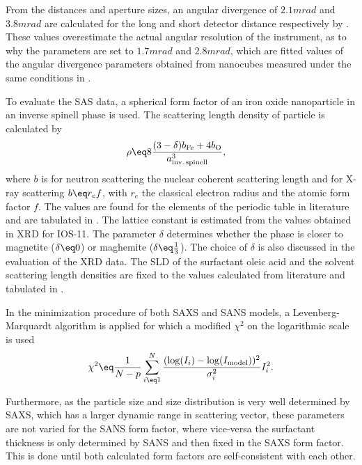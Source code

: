 \documentclass[\main/dresen_thesis.tex]{subfiles}
\begin{document}
    From the distances and aperture sizes, an angular divergence of $2.1 \unit{mrad}$ and $3.8 \unit{mrad}$ are calculated for the long and short detector distance respectively by .
    These values overestimate the actual angular resolution of the instrument, as to why the parameters are set to $1.7 \unit{mrad}$ and $2.8 \unit{mrad}$, which are fitted values of the angular divergence parameters obtained from nanocubes measured under the same conditions in .

    To evaluate the SAS data, a spherical form factor of an iron oxide nanoparticle in an inverse spinell phase is used.
    The scattering length density of particle is calculated by
    \begin{align}
      \rho &\eq   8 \frac{(3-\delta) b_\mathrm{Fe} + 4 b_\mathrm{O}}{a_\mathrm{inv.\,spinell}^3},
    \end{align}
    where $b$ is for neutron scattering the nuclear coherent scattering length and for X-ray scattering $b \eq r_e f$, with $r_e$ the classical electron radius and the  atomic form factor $f$.
    The values are found for the elements of the periodic table in literature \cite{Sears_1992_Neutr, BerkeleyLab_1993_asf} and are tabulated in .
    The lattice constant is estimated from the values obtained in XRD for IOS-11.
    The parameter $\delta$ determines whether the phase is closer to magnetite ($\delta \eq 0$) or maghemite ($\delta \eq \tfrac{1}{3}$).
    The choice of $\delta$ is also discussed in the evaluation of the XRD data.
    The SLD of the surfactant oleic acid and the solvent scattering length densities are fixed to the values calculated from literature and tabulated in .

    In the minimization procedure of both SAXS and SANS models, a Levenberg-Marquardt algorithm\cite{Marquardt_1963_Analgo, Oliphant_2006_Guide} is applied for which a modified $\chi^2$ on the logarithmic scale is used
    \begin{align}
      \chi^2 \eq \frac{1}{N-p} \sum_{i\eq 1}^{N} \frac{(\log(I_i) - \log(I_\mathrm{model}))^2}{\sigma_i^2} I^2_i.
    \end{align}

    Furthermore, as the particle size and size distribution is very well determined by SAXS, which has a larger dynamic range in scattering vector, these parameters are not varied for the SANS form factor, where vice-versa the surfactant thickness is only determined by SANS and then fixed in the SAXS form factor.
    This is done until both calculated form factors are self-consistent with each other.
\end{document}
